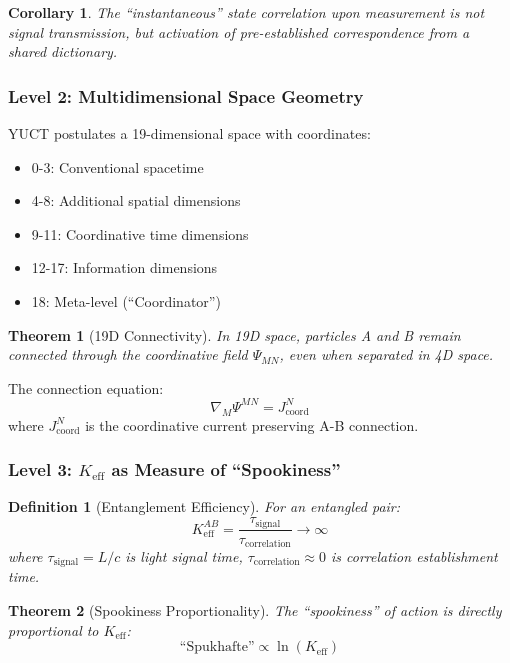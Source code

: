 \documentclass[11pt,a4paper]{article}
\newtheorem{theorem}{Theorem}
\newtheorem{definition}{Definition}
\newtheorem{corollary}{Corollary}
\begin{document}
	\begin{corollary}
		The ``instantaneous'' state correlation upon measurement is not signal transmission, but activation of pre-established correspondence from a shared dictionary.
	\end{corollary}
	
	\subsubsection{Level 2: Multidimensional Space Geometry}
	YUCT postulates a 19-dimensional space with coordinates:
	\begin{itemize}
		\item 0-3: Conventional spacetime
		\item 4-8: Additional spatial dimensions
		\item 9-11: Coordinative time dimensions
		\item 12-17: Information dimensions
		\item 18: Meta-level (``Coordinator'')
	\end{itemize}
	
	\begin{theorem}[19D Connectivity]
		In 19D space, particles A and B remain connected through the coordinative field $\Psi_{MN}$, even when separated in 4D space.
	\end{theorem}
	
	The connection equation:
	\begin{equation}
		\nabla_M \Psi^{MN} = J^N_{\text{coord}}
	\end{equation}
	where $J^N_{\text{coord}}$ is the coordinative current preserving A-B connection.
	
	\subsubsection{Level 3: $K_{\mathrm{eff}}$ as Measure of ``Spookiness''}
	\begin{definition}[Entanglement Efficiency]
		For an entangled pair:
		\begin{equation}
			K_{\mathrm{eff}}^{AB} = \frac{\tau_{\text{signal}}}{\tau_{\text{correlation}}} \to \infty
		\end{equation}
		where $\tau_{\text{signal}} = L/c$ is light signal time, $\tau_{\text{correlation}} \approx 0$ is correlation establishment time.
	\end{definition}
	
	\begin{theorem}[Spookiness Proportionality]
		The ``spookiness'' of action is directly proportional to $K_{\mathrm{eff}}$:
		\begin{equation}
			\text{``Spukhafte''} \propto \ln(K_{\mathrm{eff}})
		\end{equation}
	\end{theorem}
	
\end{document}
